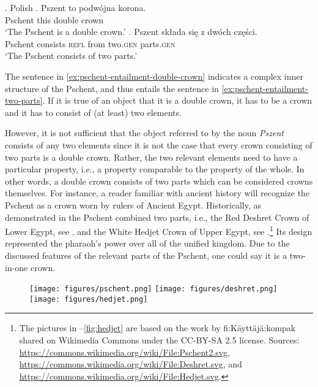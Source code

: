 \ex. Polish\label{ex:pschent-entailment}
\ag. \jdg{} Pszent to podwójna korona.\\
{} Pschent this double crown\\
`The Pschent is a double crown.'\label{ex:pschent-entailment-double-crown}
\bg. \jdg{$\models$} Pszent składa się z dwóch części.\\
 {} Pschent consists \textsc{refl} from two\textsc{.gen} parts\textsc{.gen}\\
`The Pschent consists of two parts.'\label{ex:pschent-entailment-two-parts}

The sentence in \ref{ex:pschent-entailment-double-crown} indicates a complex inner structure of the Pschent, and thus entails the sentence in \ref{ex:pschent-entailment-two-parts}. If it is true of an object that it is a double crown, it has to be a crown and it has to consist of (at least) two elements.

However, it is not sufficient that the object referred to by the noun \textit{Pszent} consists of any two elements since it is not the case that every crown consisting of two parts is a double crown. Rather, the two relevant elements need to have a particular property, i.e., a property comparable to the property of the whole. In other words, a double crown consists of two parts which can be considered crowns themselves. For instance, a reader familiar with ancient history will recognize the Pschent as a crown worn by rulers of Ancient Egypt. Historically, as demonstrated in  the Pschent combined two parts, i.e., the Red Deshret Crown of Lower Egypt, see , and the White Hedjet Crown of Upper Egypt, see .\footnote{The pictures in --\ref{fig:hedjet} are based on the work by fi:Käyttäjä:kompak shared on Wikimedia Commons under the CC-BY-SA 2.5 license. Sources: \url{https://commons.wikimedia.org/wiki/File:Pschent2.svg}, \url{https://commons.wikimedia.org/wiki/File:Deshret.svg}, and \url{https://commons.wikimedia.org/wiki/File:Hedjet.svg}.} Its design represented the pharaoh's power over all of the unified kingdom. Due to the discussed features of the relevant parts of the Pschent, one could say it is a two-in-one crown.

\begin{figure}[h!]
\begin{floatrow}
\captionsetup{margin=.05\linewidth}
        {\texttt{[image: figures/pschent.png]}}
        {\texttt{[image: figures/deshret.png]}}
        {\texttt{[image: figures/hedjet.png]}}
\end{floatrow}
\end{figure}

